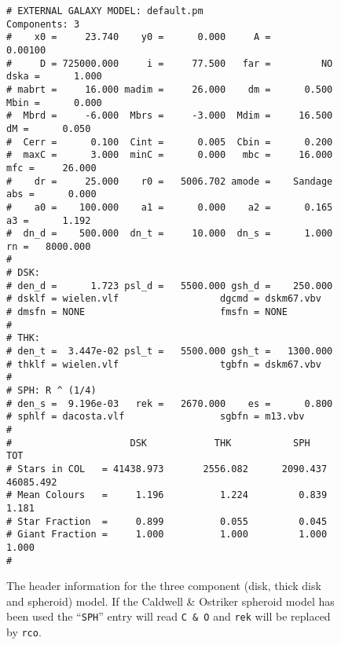 \begin{figure}[p]
\begin{center}
\begin{verbatim}
# EXTERNAL GALAXY MODEL: default.pm                       Components: 3 
#    x0 =     23.740    y0 =      0.000     A =      0.00100
#     D = 725000.000     i =     77.500   far =         NO  dska =      1.000
# mabrt =     16.000 madim =     26.000    dm =      0.500  Mbin =      0.000
#  Mbrd =     -6.000  Mbrs =     -3.000  Mdim =     16.500    dM =      0.050
#  Cerr =      0.100  Cint =      0.005  Cbin =      0.200
#  maxC =      3.000  minC =      0.000   mbc =     16.000   mfc =     26.000
#    dr =     25.000    r0 =   5006.702 amode =    Sandage   abs =      0.000
#    a0 =    100.000    a1 =      0.000    a2 =      0.165    a3 =      1.192
#  dn_d =    500.000  dn_t =     10.000  dn_s =      1.000    rn =   8000.000
#
# DSK:
# den_d =      1.723 psl_d =   5500.000 gsh_d =    250.000
# dsklf = wielen.vlf                  dgcmd = dskm67.vbv              
# dmsfn = NONE                        fmsfn = NONE                    
#
# THK:
# den_t =  3.447e-02 psl_t =   5500.000 gsh_t =   1300.000
# thklf = wielen.vlf                  tgbfn = dskm67.vbv              
#
# SPH: R ^ (1/4)
# den_s =  9.196e-03   rek =   2670.000    es =      0.800
# sphlf = dacosta.vlf                 sgbfn = m13.vbv                 
#
#                     DSK            THK           SPH            TOT
# Stars in COL   = 41438.973       2556.082      2090.437      46085.492
# Mean Colours   =     1.196          1.224         0.839          1.181
# Star Fraction  =     0.899          0.055         0.045
# Giant Fraction =     1.000          1.000         1.000          1.000
#
\end{verbatim}
\end{center}
\caption{The header information for the three component (disk, thick disk
and spheroid) model. If the Caldwell \& Ostriker spheroid model has been used 
the ``{\tt SPH}'' entry will read {\tt C \& O} and {\tt rek} will be replaced 
by {\tt rco}.}
\end{figure}

